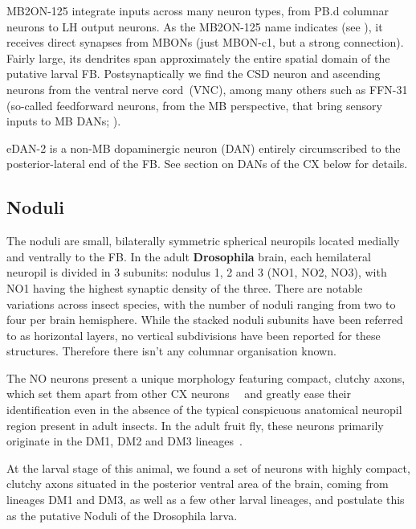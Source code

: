     MB2ON-125 integrate inputs across many neuron types, from PB.d columnar neurons to LH output neurons.
    As the MB2ON-125 name indicates (see \citep{eschbach2021circuits}), it receives direct synapses from MBONs (just MBON-c1, but a strong connection).
    Fairly large, its dendrites span approximately the entire spatial domain of the putative larval FB.
    Postsynaptically we find the CSD neuron \citep{berck2016wiring} and ascending neurons from the ventral nerve cord~(VNC), among many others such as FFN-31 (so-called feedforward neurons, from the MB perspective, that bring sensory inputs to MB DANs; \citep{eschbach2021circuits}).

    eDAN-2 is a non-MB dopaminergic neuron (DAN) entirely circumscribed to the posterior-lateral end of the FB. See section on DANs of the CX below for details.




    \subsection{Noduli}
    \label{NO}
    The noduli are small, bilaterally symmetric spherical neuropils located medially and ventrally to the FB. In the adult \textbf{Drosophila} brain, each hemilateral neuropil is divided in 3 subunits: nodulus 1, 2 and 3 (NO1, NO2, NO3), with NO1 having the highest synaptic density of the three. There are notable variations across insect species, with the number of noduli ranging from two to four per brain hemisphere.
    While the stacked noduli subunits have been referred to as horizontal layers, no vertical subdivisions have been reported for these structures. Therefore there isn't any columnar organisation known.


    The NO neurons present a unique morphology featuring compact, clutchy axons, which set them apart from other CX neurons~\citep{wolff2018neuroarchitecture}~\citep{hulse2021connectome} and greatly ease their identification even in the absence of the typical conspicuous anatomical neuropil region present in adult insects. In the adult fruit fly, these neurons primarily originate in the DM1, DM2 and DM3 lineages~\citep{andrade2019developmentally}.


    At the larval stage of this animal, we found a set of neurons with highly compact, clutchy axons situated in the posterior ventral area of the brain, coming from lineages DM1 and DM3, as well as a few other larval lineages, and postulate this as the putative Noduli of the Drosophila larva. 

